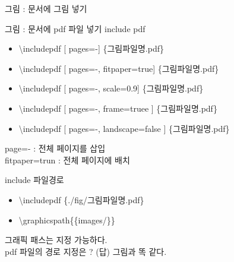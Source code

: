 \documentclass[ aspectratio=149,  14pt,blue,xcolor=pdftex,dvipsnames,table,handout,notes]{beamer}
\begin{document}
\begin{frame}[t]{그림 : 문서에 그림 넣기}
			\begin{block} {그림 : 문서에 pdf 파일 넣기 include pdf}
			\begin{itemize}
			\item[]	\textbackslash includepdf [ pages=-] \{그림파일명.pdf\}
			\item[]	\textbackslash includepdf [ pages=-, fitpaper=true] \{그림파일명.pdf\}
			\item[]	\textbackslash includepdf [ pages=-, scale=0.9] \{그림파일명.pdf\}
			\item[]	\textbackslash includepdf [ pages=-, frame=truee ] \{그림파일명.pdf\}
			\item[]	\textbackslash includepdf [ pages=-, landscape=false ] \{그림파일명.pdf\}
			\end{itemize}
			\end{block}

			page=- : 전체 페이지를 삽입\\
			fitpaper=trun : 전체 페이지에 배치

			\begin{block} {include 파일경로}
			\begin{itemize}
			\item[]	\textbackslash includepdf \{./fig/그림파일명.pdf\}
			\item[]	\textbackslash graphicspath\{\{images/\}\}   

			\end{itemize}
			\end{block}

			그래픽 패스는 지정 가능하다.\\
			pdf 파일의 경로 지정은 ? (답) 그림과 똑 같다.

		\end{frame}
























		\begin{frame}[plain]
		\centering
		\scalebox{10}{수식}

		
		\end{frame}
\end{document}
